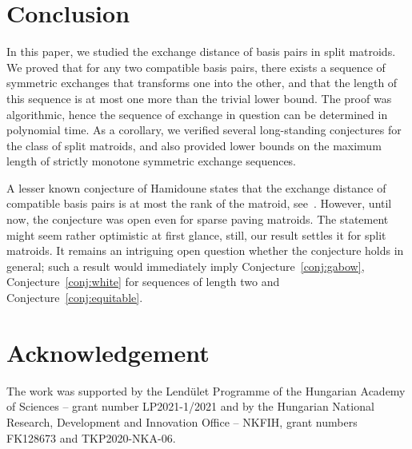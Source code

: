 \documentclass[11pt,a4paper]{article}
\theoremstyle{plain}
\theoremstyle{definition}
\begin{document}
\section{Conclusion}

In this paper, we studied the exchange distance of basis pairs in split matroids. We proved that for any two compatible basis pairs, there exists a sequence of symmetric exchanges that transforms one into the other, and that the length of this sequence is at most one more than the trivial lower bound. The proof was algorithmic, hence the sequence of exchange in question can be determined in polynomial time. As a corollary, we verified several long-standing conjectures for the class of split matroids, and also provided lower bounds on the maximum length of strictly monotone symmetric exchange sequences.

A lesser known conjecture of Hamidoune states that the exchange distance of compatible basis pairs is at most the rank of the matroid, see~\cite{cordovil1993bases}. However, until now, the conjecture was open even for sparse paving matroids. The statement might seem rather optimistic at first glance, still, our result settles it for split matroids. It remains an intriguing open question whether the conjecture holds in general; such a result would immediately imply Conjecture~\ref{conj:gabow}, Conjecture~\ref{conj:white} for sequences of length two and Conjecture~\ref{conj:equitable}.

\section*{Acknowledgement} The work was supported by the Lend\"ulet Programme of the Hungarian Academy of Sciences -- grant number LP2021-1/2021 and by the Hungarian National Research, Development and Innovation Office -- NKFIH, grant numbers FK128673 and TKP2020-NKA-06.



\end{document}
